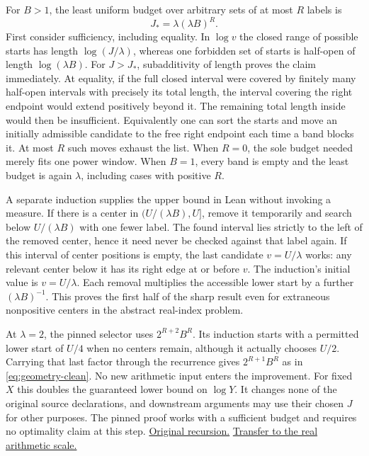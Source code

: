 \documentclass[12pt,letterpaper]{article}
\begin{document}
For \(B>1\), the least uniform budget over arbitrary sets of at most \(R\) labels is
\begin{equation}
            J_* = \lambda(\lambda B)^R.
            \label{eq:geometry-clean}
\end{equation}
First consider sufficiency, including equality. In \(\log v\) the closed range of possible starts has length \(\log(J/\lambda)\), whereas one forbidden set of starts is half-open of length \(\log(\lambda B)\). For \(J>J_*\), subadditivity of length proves the claim immediately. At equality, if the full closed interval were covered by finitely many half-open intervals with precisely its total length, the interval covering the right endpoint would extend positively beyond it. The remaining total length inside would then be insufficient. Equivalently one can sort the starts and move an initially admissible candidate to the free right endpoint each time a band blocks it. At most \(R\) such moves exhaust the list. When \(R=0\), the sole budget needed merely fits one power window. When \(B=1\), every band is empty and the least budget is again \(\lambda\), including cases with positive \(R\).

A separate induction supplies the upper bound in Lean without invoking a measure. If there is a center in \((U/(\lambda B),U]\), remove it temporarily and search below \(U/(\lambda B)\) with one fewer label. The found interval lies strictly to the left of the removed center, hence it need never be checked against that label again. If this interval of center positions is empty, the last candidate \(v=U/\lambda\) works: any relevant center below it has its right edge at or before \(v\). The induction's initial value is \(v=U/\lambda\). Each removal multiplies the accessible lower start by a further \((\lambda B)^{-1}\). This proves the first half of the sharp result even for extraneous nonpositive centers in the abstract real-index problem.

At \(\lambda=2\), the pinned selector uses \(2^{R+2}B^R\). Its induction starts with a permitted lower start of \(U/4\) when no centers remain, although it actually chooses \(U/2\). Carrying that last factor through the recurrence gives \(2^{R+1}B^R\) as in \eqref{eq:geometry-clean}. No new arithmetic input enters the improvement. For fixed \(X\) this doubles the guaranteed lower bound on \(\log Y\). It changes none of the original source declarations, and downstream arguments may use their chosen \(J\) for other purposes. The pinned proof works with a sufficient budget and requires no optimality claim at this step. \href{https://github.com/nousentllc/riemann-hypothesis/blob/40e56bab026552e089d7afcfeff08d2defb9c005/src/Development/AutomorphicArithmetic/AutomorphicVarieties/LayeredIsomorphisms/Window1.lean#L6-L40}{Original recursion.} \href{https://github.com/nousentllc/riemann-hypothesis/blob/40e56bab026552e089d7afcfeff08d2defb9c005/src/Development/AutomorphicArithmetic/AutomorphicVarieties/LayeredIsomorphisms/Window.lean#L7-L23}{Transfer to the real arithmetic scale.}
\end{document}
